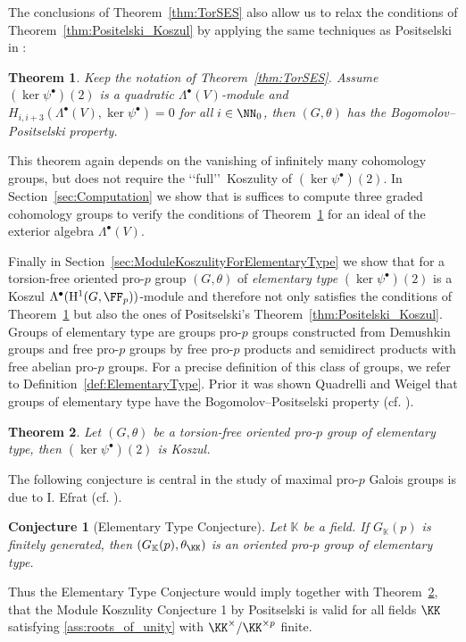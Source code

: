 \documentclass{amsart}
\newtheorem*{conj*}{Conjecture}
\newtheorem{mainthm}{Theorem}
\theoremstyle{definition}
\theoremstyle{remark}
\newcommand{\rmH}{\mathrm{H}}
\numberwithin{equation}{section}
\begin{document}
The conclusions of Theorem~\ref{thm:TorSES} also allow us to relax the conditions of Theorem~\ref{thm:Positelski_Koszul} by applying the same techniques as Positselski in \cite[Theorem 4]{Positselski2005}:
\begin{mainthm}
\label{thm:WeakKoszulBPC}
Keep the notation of Theorem~\ref{thm:TorSES}. Assume $(\ker \psi^\bullet)(2)$ is a quadratic $\Lambda^\bullet(V)$-module and $H_{i,i+3}(\Lambda^\bullet(V),\ker\psi^\bullet)=0$ for all $i\in \NN_0$, then $(G,\theta)$ has the Bogomolov--Positselski property.
\end{mainthm}
This theorem again depends on the vanishing of infinitely many cohomology groups, but does not require the \lq\lq full\rq\rq\, Koszulity of $(\ker\psi^\bullet)(2)$. In Section~\ref{sec:Computation} we show that is suffices to compute three graded cohomology groups to verify the conditions of Theorem~\ref{thm:WeakKoszulBPC} for an ideal of the exterior algebra $\Lambda^\bullet(V)$.

Finally in Section~\ref{sec:ModuleKoszulityForElementaryType} we show that for a torsion-free oriented pro-$p$ group $(G,\theta)$ of \emph{elementary type} $(\ker \psi^\bullet)(2)$ is a Koszul $\Lambda^\bullet(\rmH^1(G,\FF_p))$-module and therefore not only satisfies the conditions of Theorem~\ref{thm:WeakKoszulBPC} but also the ones of Positselski's Theorem~\ref{thm:Positelski_Koszul}. Groups of elementary type are groups pro-$p$ groups constructed from Demushkin groups and free pro-$p$ groups by free pro-$p$ products and semidirect products with free abelian pro-$p$ groups. For a precise definition of this class of groups, we refer to Definition~\ref{def:ElementaryType}. Prior it was shown Quadrelli and Weigel that groups of elementary type have the Bogomolov--Positselski property (cf. \cite[Section 5]{QuadrelliWeigel2022}). 
\begin{mainthm}
\label{thm:Elementary Type satisfies Module Koszulity}
    Let $(G,\theta)$ be a torsion-free oriented pro-$p$ group of elementary type, then $(\ker \psi^\bullet)(2)$ is Koszul.
\end{mainthm}
The following conjecture is central in the study of maximal pro-$p$ Galois groups is due to I. Efrat (cf. \cites{Efrat1997, Efrat1998, Efrat1999}).
\begin{conj*}[Elementary Type Conjecture]
\label{conj:ElementaryType}
    Let $\mathbb{K}$ be a field. If $G_{\mathbb{K}}(p)$ is finitely generated, then $(G_{\mathbb{K}}(p),\theta_{\KK})$ is an oriented pro-$p$ group of elementary type.
\end{conj*}
Thus the Elementary Type Conjecture would imply together with Theorem~\ref{thm:Elementary Type satisfies Module Koszulity}, that the Module Koszulity Conjecture 1 by Positselski is valid for all fields $\KK$ satisfying \ref{ass:roots_of_unity} with $\KK^\times/\KK^{\times p}$ finite. 
\end{document}

